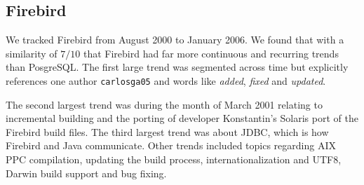 \documentclass[times, 10pt,twocolumn]{article}
\newcommand{\shrinkit}{\vspace*{-.3em}}
\begin{document}








\shrinkit
\subsection{Firebird}
\shrinkit


We tracked Firebird from August 2000 to January 2006. We found that with a
similarity of $7/10$ that Firebird had far more continuous and
recurring trends than PosgreSQL.  The first large trend was segmented
across time but explicitly references one author \texttt{carlosga05}
and words like \emph{added}, \emph{fixed} and \emph{updated}.

The second largest trend was during the month of March 2001 relating
to incremental building and the porting of developer Konstantin's
Solaris port of the Firebird build files. The third largest trend was
about JDBC, which is how Firebird and Java communicate.  Other trends
included topics regarding AIX PPC compilation, updating the build
process, internationalization and UTF8, Darwin build support and bug
fixing.
\end{document}
